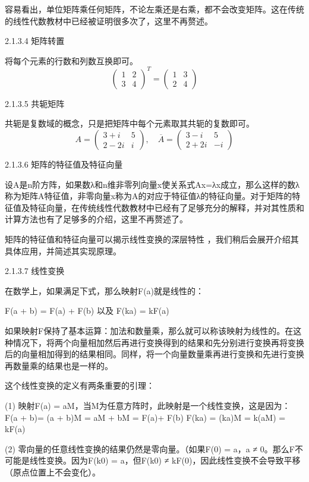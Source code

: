容易看出，单位矩阵乘任何矩阵，不论左乘还是右乘，都不会改变矩阵。这在传统的线性代数教材中已经被证明很多次了，这里不再赘述。

2.1.3.4 矩阵转置

将每个元素的行数和列数互换即可。
$$\begin{pmatrix}1&2\\3&4\end{pmatrix}^T=\begin{pmatrix}1&3\\2&4\end{pmatrix}$$

2.1.3.5 共轭矩阵

共轭是复数域的概念，只是把矩阵中每个元素取其共轭的复数即可。
$$A=\begin{pmatrix}3+i&5\\2-2i&i\end{pmatrix}, \quad \overline{A}=\begin{pmatrix}3-i&5\\2+2i&-i\end{pmatrix}$$

2.1.3.6 矩阵的特征值及特征向量

设A是n阶方阵，如果数λ和n维非零列向量x使关系式Ax=λx成立，那么这样的数λ称为矩阵A特征值，非零向量x称为A的对应于特征值λ的特征向量。对于矩阵的特征值及特征向量，在传统线性代数教材中已经有了足够充分的解释，并对其性质和计算方法也有了足够多的介绍，这里不再赘述了。

矩阵的特征值和特征向量可以揭示线性变换的深层特性 ，我们稍后会展开介绍其具体应用，并简述其实现原理。

2.1.3.7 线性变换

在数学上，如果满足下式，那么映射F(a)就是线性的：

F(a + b) = F(a) + F(b) 以及  F(ka) = kF(a)

如果映射F保持了基本运算：加法和数量乘，那么就可以称该映射为线性的。在这种情况下，将两个向量相加然后再进行变换得到的结果和先分别进行变换再将变换后的向量相加得到的结果相同。同样，将一个向量数量乘再进行变换和先进行变换再数量乘的结果也是一样的。

这个线性变换的定义有两条重要的引理：

(1) 映射F(a) = aM，当M为任意方阵时，此映射是一个线性变换，这是因为：
F(a + b)= (a + b)M = aM + bM = F(a)+ F(b)
F(ka) = (ka)M = k(aM) = kF(a)

(2) 零向量的任意线性变换的结果仍然是零向量。（如果F(0) = a，a ≠ 0。那么F不可能是线性变换。因为F(k0) = a，但F(k0) ≠ kF(0)，因此线性变换不会导致平移（原点位置上不会变化）。


